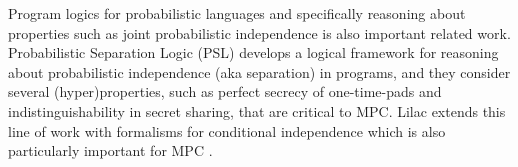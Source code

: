 Program logics for probabilistic languages and specifically reasoning
about properties such as joint probabilistic independence is also
important related work. Probabilistic Separation Logic (PSL)
\cite{barthe2019probabilistic} develops a logical framework for
reasoning about probabilistic independence (aka separation) in
programs, and they consider several (hyper)properties, such as perfect
secrecy of one-time-pads and indistinguishability in secret sharing,
that are critical to MPC. Lilac \cite{li2023lilac} extends this line
of work with formalisms for conditional independence which is 
also particularly important for MPC \cite{skalka-near-ppdp24}.
